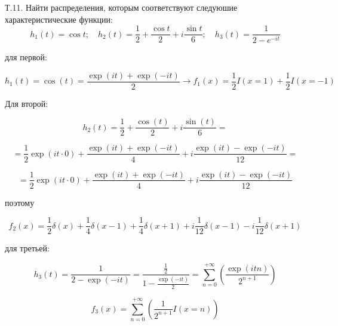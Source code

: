 \documentclass[a4paper,12pt]{article} %
\begin{document}
\begin{example}

Т.11. Найти распределения, которым соответствуют следуюшие характеристические функции:
$$
h_{1}(t)=\cos t ; 
\quad 
h_{2}(t)=\frac{1}{2}+\frac{\cos t}{2}+i \frac{\sin t}{6} ; 
\quad 
h_{3}(t)=\frac{1}{2-e^{-i t}}
$$


для первой:


\begin{equation}
h_{1}(t)=\cos (t)=\frac{\exp (i t)+\exp (-i t)}{2} \rightarrow f_{1}(x)=\frac{1}{2} I(x=1)+\frac{1}{2} I(x=-1)
\end{equation}





Для второй:

$$
h_{2}(t)=\frac{1}{2}+\frac{\cos (t)}{2}+i \frac{\sin (t)}{6}=
$$


$$
=
\frac{1}{2} \exp (i t \cdot 0)+\frac{\exp (i t)+\exp (-i t)}{4}+i \frac{\exp (i t)-\exp (-i t)}{12}
=
$$


$$
=
\frac{1}{2} \exp (i t \cdot 0)+\frac{\exp (i t)+\exp (-i t)}{4}+i \frac{\exp (i t)-\exp (-i t)}{12}
$$

поэтому

$$
f_{2}(x)=\frac{1}{2} \delta(x)+\frac{1}{4} \delta(x-1)+\frac{1}{4} \delta(x+1)+i \frac{1}{12} \delta(x-1)-i \frac{1}{12} \delta(x+1)
$$



для третьей:


$$
h_{3}(t)=\frac{1}{2-\exp (-i t)}=\frac{\frac{1}{2}}{1-\frac{\exp (-i t)}{2}}=\sum_{n=0}^{+\infty}\left(\frac{\exp (i t n)}{2^{n+1}}\right)
$$


\[ f_{3}(x)=\sum_{n=0}^{+\infty}\left(\frac{1}{2^{n+1}} I(x=n)\right)
 \]






\end{example}
\end{document}
